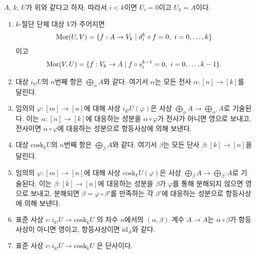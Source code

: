 \begin{lemma}
\label{lemma-eilenberg-maclane-object}
$A$, $k$, $U$가 위와 같다고 하자. 따라서 $i < k$이면 $U_i = 0$이고
$U_k = A$이다.
\begin{enumerate}
\item $k$-절단 단체 대상 $V$가 주어지면
$$
\mathop{\mathrm{Mor}}\nolimits(U, V)
=
\{ f : A \to V_k \mid d^k_i \circ f = 0, \ i = 0, \ldots, k \}
$$
이고
$$
\mathop{\mathrm{Mor}}\nolimits(V, U)
=
\{ f : V_k \to A \mid f \circ s^{k - 1}_i = 0, \ i = 0, \ldots, k - 1 \}.
$$
\item 대상 $i_{k!} U$의 $n$번째 항은 $\bigoplus_\alpha A$와 같다.
여기서 $\alpha$는 모든 전사 $\alpha : [n] \to [k]$를 달린다.
\item 임의의 $\varphi : [m] \to [n]$에 대해 사상
$i_{k!} U(\varphi)$은 사상 $\bigoplus_\alpha A \to \bigoplus_{\alpha'} A$로
기술된다. 이는 $\alpha : [n] \to [k]$에 대응하는 성분을
$\alpha \circ \varphi$가 전사가 아니면 영으로 보내고, 전사이면
$\alpha \circ \varphi$에 대응하는 성분으로 항등사상에 의해 보낸다.
\item 대상 $\text{cosk}_k U$의 $n$번째 항은 $\bigoplus_\beta A$와 같다.
여기서 $\beta$는 모든 단사 $\beta : [k] \to [n]$을 달린다.
\item 임의의 $\varphi : [m] \to [n]$에 대해 사상
$\text{cosk}_k U(\varphi)$은 사상
$\bigoplus_\beta A \to \bigoplus_{\beta'} A$로 기술된다. 이는
$\beta : [k] \to [n]$에 대응하는 성분을 $\beta$가 $\varphi$를 통해
분해되지 않으면 영으로 보내고, 분해되면
$\beta = \varphi \circ \beta'$를 만족하는 각 $\beta'$에 대응하는 성분으로
항등사상에 의해 보낸다.
\item 표준 사상
$
c : i_{k !} U \to \text{cosk}_k U
$
의 차수 $n$에서의 $(\alpha, \beta)$ 계수 $A \to A$는
$\alpha \circ \beta$가 항등사상이 아니면 영이고, 항등사상이면
$\text{id}_A$와 같다.
\item 표준 사상
$
c : i_{k !} U \to \text{cosk}_k U
$
은 단사이다.
\end{enumerate}
\end{lemma}

